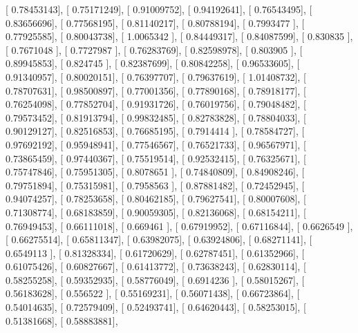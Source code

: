 \documentclass{article}
\begin{document}
       [ 0.78453143],
       [ 0.75171249],
       [ 0.91009752],
       [ 0.94192641],
       [ 0.76543495],
       [ 0.83656696],
       [ 0.77568195],
       [ 0.81140217],
       [ 0.80788194],
       [ 0.7993477 ],
       [ 0.77925585],
       [ 0.80043738],
       [ 1.0065342 ],
       [ 0.84449317],
       [ 0.84087599],
       [ 0.830835  ],
       [ 0.7671048 ],
       [ 0.7727987 ],
       [ 0.76283769],
       [ 0.82598978],
       [ 0.803905  ],
       [ 0.89945853],
       [ 0.824745  ],
       [ 0.82387699],
       [ 0.80842258],
       [ 0.96533605],
       [ 0.91340957],
       [ 0.80020151],
       [ 0.76397707],
       [ 0.79637619],
       [ 1.01408732],
       [ 0.78707631],
       [ 0.98500897],
       [ 0.77001356],
       [ 0.77890168],
       [ 0.78918177],
       [ 0.76254098],
       [ 0.77852704],
       [ 0.91931726],
       [ 0.76019756],
       [ 0.79048482],
       [ 0.79573452],
       [ 0.81913794],
       [ 0.99832485],
       [ 0.82783828],
       [ 0.78804033],
       [ 0.90129127],
       [ 0.82516853],
       [ 0.76685195],
       [ 0.7914414 ],
       [ 0.78584727],
       [ 0.97692192],
       [ 0.95948941],
       [ 0.77546567],
       [ 0.76521733],
       [ 0.96567971],
       [ 0.73865459],
       [ 0.97440367],
       [ 0.75519514],
       [ 0.92532415],
       [ 0.76325671],
       [ 0.75747846],
       [ 0.75951305],
       [ 0.8078651 ],
       [ 0.74840809],
       [ 0.84908246],
       [ 0.79751894],
       [ 0.75315981],
       [ 0.7958563 ],
       [ 0.87881482],
       [ 0.72452945],
       [ 0.94074257],
       [ 0.78253658],
       [ 0.80462185],
       [ 0.79627541],
       [ 0.80007608],
       [ 0.71308774],
       [ 0.68183859],
       [ 0.90059305],
       [ 0.82136068],
       [ 0.68154211],
       [ 0.76949453],
       [ 0.66111018],
       [ 0.669461  ],
       [ 0.67919952],
       [ 0.67116844],
       [ 0.6626549 ],
       [ 0.66275514],
       [ 0.65811347],
       [ 0.63982075],
       [ 0.63924806],
       [ 0.68271141],
       [ 0.6549113 ],
       [ 0.81328334],
       [ 0.61720629],
       [ 0.62787451],
       [ 0.61352966],
       [ 0.61075426],
       [ 0.60827667],
       [ 0.61413772],
       [ 0.73638243],
       [ 0.62830114],
       [ 0.58255258],
       [ 0.59352935],
       [ 0.58776049],
       [ 0.6914236 ],
       [ 0.58015267],
       [ 0.56183628],
       [ 0.556522  ],
       [ 0.55169231],
       [ 0.56071438],
       [ 0.66723864],
       [ 0.54014635],
       [ 0.72579409],
       [ 0.52493741],
       [ 0.64620443],
       [ 0.58253015],
       [ 0.51381668],
       [ 0.58883881],
\end{document}
